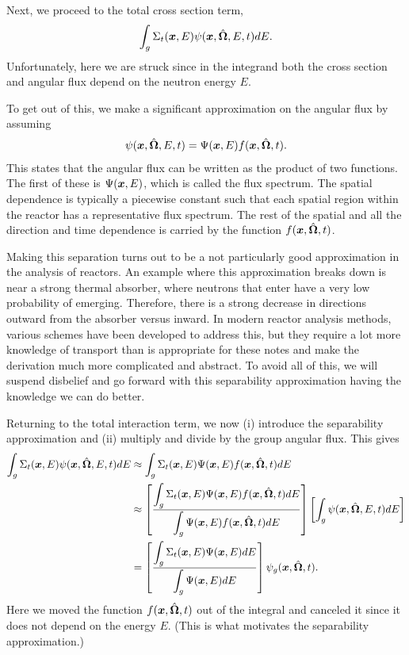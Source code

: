Next, we proceed to the total cross section term,
\begin{align}
  \int_g  \Sigma_t(\bm{x},E) \psi(\bm{x},\hat{\mathbf{\Omega}},E,t) dE . \nonumber
\end{align}
Unfortunately, here we are struck since in the integrand both the cross section and angular flux depend on the neutron energy $E$. 

To get out of this, we make a significant approximation on the angular flux by assuming
\begin{align}
  \psi(\bm{x},\hat{\mathbf{\Omega}},E,t) = \Psi(\bm{x},E) f(\bm{x},\hat{\mathbf{\Omega}},t) .
\end{align}
This states that the angular flux can be written as the product of two functions. The first of these is $\Psi(\bm{x},E)$, which is called the flux spectrum. The spatial dependence is typically a piecewise constant such that each spatial region within the reactor has a representative flux spectrum. The rest of the spatial and all the direction and time dependence is carried by the function $f(\bm{x},\hat{\mathbf{\Omega}},t)$. 

Making this separation turns out to be a not particularly good approximation in the analysis of reactors. An example where this approximation breaks down is near a strong thermal absorber, where neutrons that enter have a very low probability of emerging. Therefore, there is a strong decrease in directions outward from the absorber versus inward. In modern reactor analysis methods, various schemes have been developed to address this, but they require a lot more knowledge of transport than is appropriate for these notes and make the derivation much more complicated and abstract. To avoid all of this, we will suspend disbelief and go forward with this separability approximation having the knowledge we can do better.

Returning to the total interaction term, we now (i) introduce the separability approximation and (ii) multiply and divide by the group angular flux. This gives
\begin{align}
  \int_g  \Sigma_t(\bm{x},E) \psi(\bm{x},\hat{\mathbf{\Omega}},E,t) dE &\approx \int_g  \Sigma_t(\bm{x},E) \Psi(\bm{x},E) f(\bm{x},\hat{\mathbf{\Omega}},t) dE \nonumber\\
  &\approx \left[ \dfrac{ \displaystyle\int_g  \Sigma_t(\bm{x},E) \Psi(\bm{x},E) f(\bm{x},\hat{\mathbf{\Omega}},t) dE }{ \displaystyle\int_g \Psi(\bm{x},E) f(\bm{x},\hat{\mathbf{\Omega}},t) dE } \right] \left[ \int_g  \psi(\bm{x},\hat{\mathbf{\Omega}},E,t) dE \right] \nonumber \\
  &= \left[ \dfrac{ \displaystyle\int_g  \Sigma_t(\bm{x},E) \Psi(\bm{x},E) dE }{ \displaystyle\int_g \Psi(\bm{x},E)  dE } \right] \psi_g(\bm{x},\hat{\mathbf{\Omega}},t) .
\end{align}
Here we moved the function $f(\bm{x},\hat{\mathbf{\Omega}},t)$ out of the integral and canceled it since it does not depend on the energy $E$. (This is what motivates the separability approximation.) 

